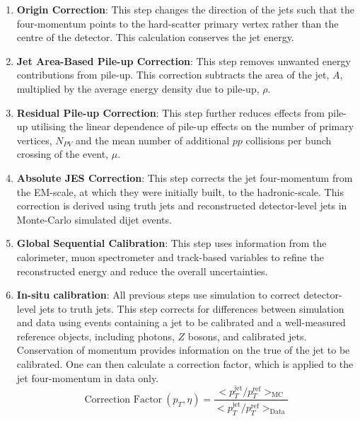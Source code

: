 \begin{enumerate}[leftmargin=*]
\item\textbf{Origin Correction}:
  This step changes the direction of the jets such that the four-momentum points to the hard-scatter primary vertex
  rather than the centre of the detector.
  This calculation conserves the jet energy.\vspace{0.3em}
\item\textbf{Jet Area-Based Pile-up Correction}:
  This step removes unwanted energy contributions from pile-up.
  This correction subtracts the area of the jet, $A$, multiplied by the average energy density due to pile-up, $\rho$.\vspace{0.3em}
\item\textbf{Residual Pile-up Correction}:
  This step further reduces effects from pile-up utilising the linear dependence of pile-up effects on
  the number of primary vertices, $N_{PV}$
  and the mean number of additional $pp$ collisions per bunch crossing of the event, $\mu$.\vspace{0.3em}
\item\textbf{Absolute JES Correction}:
  This step corrects the jet four-momentum from the EM-scale, at which they were initially built,  to the hadronic-scale.
  This correction is derived using truth jets and reconstructed detector-level jets in Monte-Carlo simulated dijet events.\vspace{0.3em}
\item\textbf{Global Sequential Calibration}:
  This step uses information from the calorimeter, muon spectrometer and track-based variables
  to refine the reconstructed energy and reduce the overall uncertainties.\vspace{0.3em}
\item\textbf{In-situ calibration}:
  All previous steps use simulation to correct detector-level jets to truth jets.
  This step corrects for differences between simulation and data using events
  containing a jet to be calibrated and a well-measured reference objects, including photons, $Z$ bosons, and calibrated jets.
  Conservation of momentum provides information on the true \pT{} of the jet to be calibrated.
  One can then calculate a correction factor, which is applied to the jet four-momentum in data only.
  \begin{equation}
    \text{Correction Factor}~(p_T, \eta) = \frac{ < p_T^{\text{jet}}/p_T^{\text{ref}}>_{\text{MC}} }{ < p_T^{\text{jet}}/p_T^{\text{ref}}>_{\text{Data}} }
  \end{equation}
\end{enumerate}

